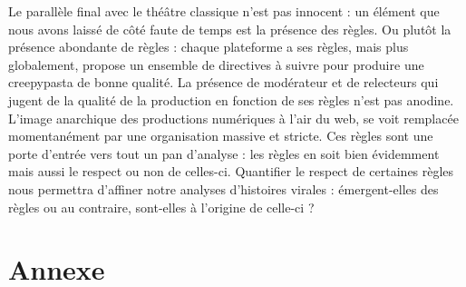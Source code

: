 \documentclass[12pt,a4paper,oneside,titlepage]{book} %
\begin{document}
Le parallèle final avec le théâtre classique n'est pas innocent : un élément que nous avons laissé de côté faute de temps est la présence des règles. Ou plutôt la présence abondante de règles : chaque plateforme a ses règles, mais plus globalement, propose un ensemble de directives à suivre pour produire une creepypasta de bonne qualité. 
La présence de modérateur et de relecteurs qui jugent de la qualité de la production en fonction de ses règles n'est pas anodine. 
L'image anarchique des productions numériques à l'air du web, se voit remplacée momentanément par une organisation massive et stricte. Ces règles sont une porte d'entrée vers tout un pan d'analyse : les règles en soit bien évidemment mais aussi le respect ou non de celles-ci. Quantifier le respect de certaines règles nous permettra d'affiner notre analyses d'histoires virales : émergent-elles des règles ou au contraire, sont-elles à l'origine de celle-ci ? 

	\pagebreak


\backmatter
	\part{Annexe}
\end{document}
